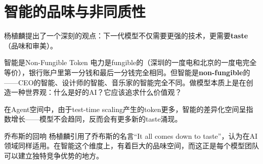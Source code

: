 \section{智能的品味与非同质性}

杨植麟提出了一个深刻的观点：下一代模型不仅需要更强的技术，更需要\textbf{taste}（品味和审美）。

\begin{importantbox}{智能是Non-Fungible Token}
电力是fungible的（深圳的一度电和北京的一度电完全等价），银行账户里第一分钱和最后一分钱完全相同。但智能是\textbf{non-fungible}的——CEO的智能、设计师的智能、音乐家的智能完全不同。做模型本质上是在创造一种世界观：什么是好的AI？它应该追求什么价值观？
\end{importantbox}

在Agent空间中，由于test-time scaling产生的token更多，智能的差异化空间呈指数增长——模型不会趋同，反而会有更多新的taste涌现。

\begin{knowledgebox}{乔布斯的回响}
杨植麟引用了乔布斯的名言``It all comes down to taste''，认为在AI领域同样适用。在智能这个维度上，有着巨大的品味空间，而这正是每个模型团队可以建立独特竞争优势的地方。
\end{knowledgebox}


